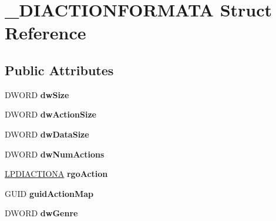 \hypertarget{struct___d_i_a_c_t_i_o_n_f_o_r_m_a_t_a}{\section{\-\_\-\-D\-I\-A\-C\-T\-I\-O\-N\-F\-O\-R\-M\-A\-T\-A Struct Reference}
\label{struct___d_i_a_c_t_i_o_n_f_o_r_m_a_t_a}
}
\subsection*{Public Attributes}
\begin{DoxyCompactItemize}
\item 
\hypertarget{struct___d_i_a_c_t_i_o_n_f_o_r_m_a_t_a_ae2779bfdf504052003740b8606958fd6}{D\-W\-O\-R\-D {\bfseries dw\-Size}}\label{struct___d_i_a_c_t_i_o_n_f_o_r_m_a_t_a_ae2779bfdf504052003740b8606958fd6}

\item 
\hypertarget{struct___d_i_a_c_t_i_o_n_f_o_r_m_a_t_a_a9cfe8b3be64a61e34a3c184575d71b71}{D\-W\-O\-R\-D {\bfseries dw\-Action\-Size}}\label{struct___d_i_a_c_t_i_o_n_f_o_r_m_a_t_a_a9cfe8b3be64a61e34a3c184575d71b71}

\item 
\hypertarget{struct___d_i_a_c_t_i_o_n_f_o_r_m_a_t_a_a1962f310b9593e8291074c4b9ae01e35}{D\-W\-O\-R\-D {\bfseries dw\-Data\-Size}}\label{struct___d_i_a_c_t_i_o_n_f_o_r_m_a_t_a_a1962f310b9593e8291074c4b9ae01e35}

\item 
\hypertarget{struct___d_i_a_c_t_i_o_n_f_o_r_m_a_t_a_a86d5b69a034c68bcc3952b6effc55351}{D\-W\-O\-R\-D {\bfseries dw\-Num\-Actions}}\label{struct___d_i_a_c_t_i_o_n_f_o_r_m_a_t_a_a86d5b69a034c68bcc3952b6effc55351}

\item 
\hypertarget{struct___d_i_a_c_t_i_o_n_f_o_r_m_a_t_a_a36c54b4a92f9b216b440a6f4d2f399cc}{\hyperlink{struct___d_i_a_c_t_i_o_n_a}{L\-P\-D\-I\-A\-C\-T\-I\-O\-N\-A} {\bfseries rgo\-Action}}\label{struct___d_i_a_c_t_i_o_n_f_o_r_m_a_t_a_a36c54b4a92f9b216b440a6f4d2f399cc}

\item 
\hypertarget{struct___d_i_a_c_t_i_o_n_f_o_r_m_a_t_a_afb88d1f8d14c3231301cfc16dd0da97d}{G\-U\-I\-D {\bfseries guid\-Action\-Map}}\label{struct___d_i_a_c_t_i_o_n_f_o_r_m_a_t_a_afb88d1f8d14c3231301cfc16dd0da97d}

\item 
\hypertarget{struct___d_i_a_c_t_i_o_n_f_o_r_m_a_t_a_a71541d64978c30be30cfb5b33304d9a5}{D\-W\-O\-R\-D {\bfseries dw\-Genre}}\label{struct___d_i_a_c_t_i_o_n_f_o_r_m_a_t_a_a71541d64978c30be30cfb5b33304d9a5}


\end{DoxyCompactItemize}
